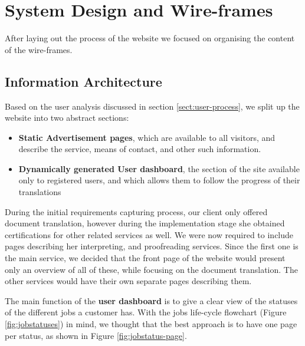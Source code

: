 \documentclass{l3proj}
\begin{document}
\newpage
\section{System Design and Wire-frames}
\label{sect:system-design-and-wireframes}
After laying out the process of the website we focused on organising the content
of the wire-frames.


\subsection{Information Architecture}
Based on the user analysis discussed in section \ref{sect:user-process}, we split
up the website into two abstract sections: 
\begin{itemize} 
	\item \textbf{Static Advertisement pages}, which are available to all visitors, and
	describe the service, means of contact, and other such information.
	\item \textbf{Dynamically generated User dashboard}, the section of the site available only to
	registered users, and which allows them to follow the progress of their translations
\end{itemize}

During the initial requirements capturing process, our client only offered
document translation, however during the implementation stage she obtained
certifications for other related services as well. We were now required to include pages
describing her interpreting, and proofreading services.
Since the first one is the main service, we decided that the front page of the
website would present only an overview of all of these, while focusing on the
document translation. The other services would have their own separate pages
describing them.

The main function of the \textbf{user dashboard} is to give a clear view of
the statuses of the different jobs a customer has. With the jobs life-cycle
flowchart (Figure \ref{fig:jobstatuses}) in mind, we thought that the best
approach is to have one page per status, as shown in Figure 
\ref{fig:jobstatus-page}.
\end{document}
